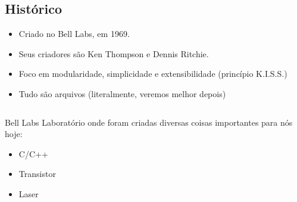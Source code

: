 \documentclass{beamer}
\begin{document}
\begin{frame}
\begin{columns}
	\end{columns}

\end{frame}

\subsection{Histórico}

\begin{frame}

  \begin{itemize}
  \item Criado no Bell Labs, em 1969.
  \item Seus criadores são Ken Thompson e Dennis Ritchie.
	\item Foco em modularidade, simplicidade e extensibilidade (princípio K.I.S.S.)
	\item Tudo são arquivos (literalmente, veremos melhor depois)
  \end{itemize}

	\begin{columns}

		\begin{block}{Bell Labs}
	    Laboratório onde foram criadas diversas coisas importantes para
			nós hoje:
	    \begin{itemize}
	    \item C/C++
	    \item Transistor
	    \item Laser
		  \end{itemize}
	  \end{block}

	\end{columns}

\end{frame}
\end{document}
